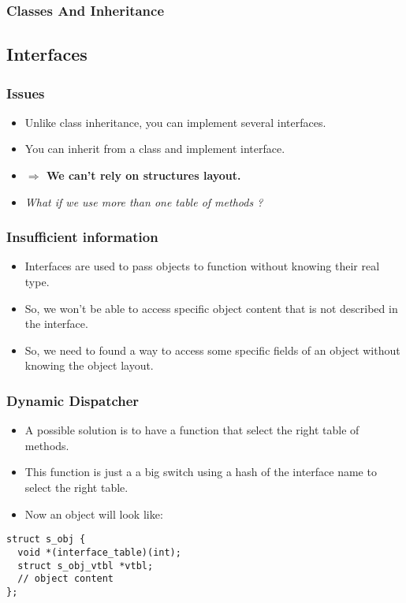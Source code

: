 \documentclass{beamer}
\begin{document}

\begin{frame}[fragile]
  \frametitle{Classes And Inheritance}
  \begin{center}
  \end{center}
\end{frame}

\subsection{Interfaces}

\begin{frame}
  \frametitle{Issues}
  \begin{itemize}
  \item Unlike class inheritance, you can implement several interfaces.
  \item You can inherit from a class and implement interface.
  \item \textbf{$\Rightarrow$ We can't rely on structures layout.}
  \item \emph{What if we use more than one table of methods ?}
  \end{itemize}
\end{frame}

\begin{frame}
  \frametitle{Insufficient information}
  \begin{itemize}
  \item Interfaces are used to pass objects to function without knowing their
    real type.
  \item So, we won't be able to access specific object content that is not
    described in the interface.
  \item So, we need to found a way to access some specific fields of an object
    without knowing the object layout.
  \end{itemize}
\end{frame}

\begin{frame}[fragile]
  \frametitle{Dynamic Dispatcher}
  \begin{itemize}
  \item A possible solution is to have a function that select the right
    table of methods.
  \item This function is just a a big switch using a hash of the interface
    name to select the right table.
  \item Now an object will look like:
  \end{itemize}
  \begin{BoxedExample}
    \footnotesize
\begin{lstlisting}
struct s_obj {
  void *(interface_table)(int);
  struct s_obj_vtbl *vtbl;
  // object content
};
\end{lstlisting}
  \end{BoxedExample}
\end{frame}
\end{document}
